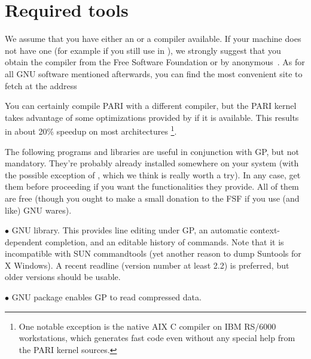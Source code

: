 %
%

\def\tocwrite#1{}
\section{Required tools}

We assume that you have either an  or a  compiler
available. If your machine does not have one (for example if you still use
 in ), we strongly suggest that you obtain the
 compiler from the Free Software Foundation or by
anonymous~. As for all GNU software mentioned afterwards, you can
find the most convenient site to fetch  at the address


\noindent
You can certainly compile PARI with a different compiler, but the PARI
kernel takes advantage of some optimizations provided by  if it is
available. This results in about 20\% speedup on most architectures%
\footnote*{One notable exception is the native AIX C compiler on IBM
RS/6000 workstations, which generates fast code even without any special
help from the PARI kernel sources.}.

 The following programs and libraries are useful
in conjunction with GP, but not mandatory. They're probably already installed
somewhere on your system (with the possible exception of ,
which we think is really worth a try). In any case, get them before
proceeding if you want the functionalities they provide. All of them are free
(though you ought to make a small donation to the FSF if you use (and like)
GNU wares).

  $\bullet$ GNU  library. This provides line editing under GP,
an automatic context-dependent completion, and an editable history of
commands. Note that it is incompatible with SUN commandtools (yet another
reason to dump Suntools for X Windows). A recent readline (version number at
least 2.2) is preferred, but older versions should be usable.

  $\bullet$ GNU  package enables GP to read
compressed data.

